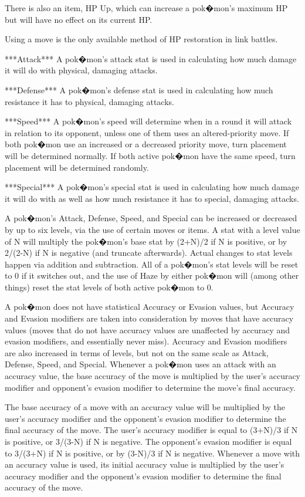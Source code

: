 \documentclass[reprint, aps, prl, paper=A4]{revtex4-1}
\begin{document}
There is also an item, HP Up, which can increase a pok�mon's maximum HP but will have no effect
on its current HP.

Using a move is the only available method of HP restoration in link battles.


***Attack***
A pok�mon's attack stat is used in calculating how much damage it will do with physical,
damaging attacks.

***Defense***
A pok�mon's defense stat is used in calculating how much resistance it has to physical,
damaging attacks.

***Speed***
A pok�mon's speed will determine when in a round it will attack in relation to its opponent,
unless one of them uses an altered-priority move. If both pok�mon use an increased or a
decreased priority move, turn placement will be determined normally. If both active pok�mon
have the same speed, turn placement will be determined randomly.

***Special***
A pok�mon's special stat is used in calculating how much damage it will do with as well as how
much resistance it has to special, damaging attacks.


A pok�mon's Attack, Defense, Speed, and Special can be increased or decreased by up to six
levels, via the use of certain moves or items. A stat with a level value of N will multiply the
pok�mon's base stat by (2+N)/2 if N is positive, or by 2/(2-N) if N is negative (and truncate
afterwards). Actual changes to stat levels happen via addition and subtraction. All of a
pok�mon's stat levels will be reset to 0 if it switches out, and the use of Haze by either
pok�mon will (among other things) reset the stat levels of both active pok�mon to 0.

A pok�mon does not have statistical Accuracy or Evasion values, but Accuracy and Evasion
modifiers are taken into consideration by moves that have accuracy values (moves that do not
have accuracy values are unaffected by accuracy and evasion modifiers, and essentially never
miss). Accuracy and Evasion modifiers are also increased in terms of levels, but not on the
same scale as Attack, Defense, Speed, and Special. Whenever a pok�mon uses an attack with an
accuracy value, the base accuracy of the move is multiplied by the user's accuracy modifier and
opponent's evasion modifier to determine the move's final accuracy.

The base accuracy of a move with an accuracy value will be multiplied by the user's accuracy
modifier and the opponent's evasion modifier to determine the final accuracy of the move.
The user's accuracy modifier is equal to (3+N)/3 if N is positive, or 3/(3-N) if N is negative.
The opponent's evasion modifier is equal to 3/(3+N) if N is positive, or by (3-N)/3 if N is
negative. Whenever a move with an accuracy value is used, its initial accuracy value is
multiplied by the user's accuracy modifier and the opponent's evasion modifier to determine the
final accuracy of the move.
\end{document}
